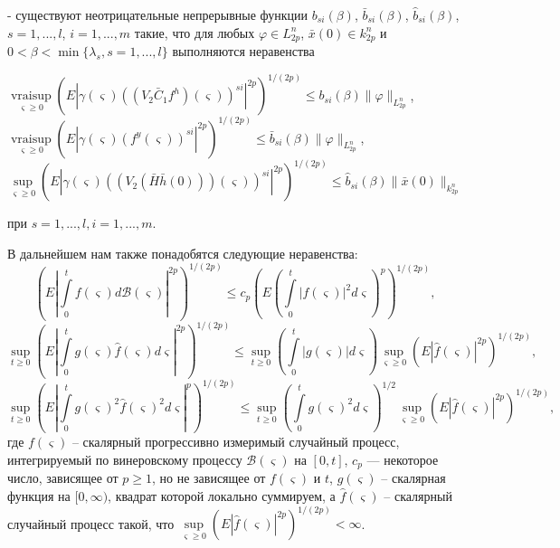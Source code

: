 - существуют неотрицательные непрерывные функции $b_{si}(\beta)$,
$\bar b_{si}(\beta)$, $\hat b_{si}(\beta)$, $s= 1, ..., l$, $i= 1,
..., m$ такие,  что для любых $\varphi \in L^n_{2p}$, $\bar x(0) \in
k_{2p}^n$ и  $0<\beta < \min \{\lambda _s, s = 1, ..., l \}$
выполняются неравенства
 \begin{center} $\mathrel {\mathop
 {vrai \sup} \limits _{\varsigma \geq 0}} \left(E\left |\gamma (\varsigma )
((V_2 \bar C_1 f^h)(\varsigma))^{si}\right |^{2p}\right )^{1/(2p)}
\leq b_{si}(\beta) \|\varphi \|_{L^n_{2p}}$, \\
$\mathrel {\mathop
 {vrai \sup} \limits _{\varsigma \geq 0} }\left(E\left|\gamma (\varsigma )
(f^y(\varsigma ))^{si}\right |^{2p}\right )^{1/(2p)}\leq \bar
b_{si}(\beta) \|\varphi \|_{L^n_{2p}}$,\\
$\sup \limits _{\varsigma \geq 0}\left (E\left |\gamma (\varsigma)
((V_2(\bar H \bar h(0)))(\varsigma))^{si}\right |^{2p}\right
)^{1/(2p)} \leq \hat b_{si}(\beta)\|\bar x(0)\|_{k^n_{2p}}$
\end{center} при $s = 1,...,l, i = 1, ..., m$.

В дальнейшем нам также понадобятся следующие неравенства:\\
 \begin{equation}
    \label{eq:kri-11}
    \left (E\left |\int \limits _0^tf(\varsigma )d\mathcal B(\varsigma
    )\right |^{2p}\right )^{1/(2p)} \leq c_p \left (E\left (\int \limits
    _0^t|f(\varsigma )|^2d\varsigma\right )^p\right )^{1/(2p)},
 \end{equation}
\begin{equation}
    \label{eq:kri-12}
     \sup \limits _{t \geq 0}\left(E\left|\int \limits
     _0^tg(\varsigma)\hat f(\varsigma)d\varsigma\right|^{2p}\right)^{1/(2p)}
     \leq \sup \limits _{t \geq 0}\left (\int \limits
     _0^t|g(\varsigma)|d\varsigma\right )
     \sup \limits _{\varsigma \geq
     0}\left (E\left |\hat f(\varsigma)\right |^{2p}\right )^{1/(2p)},
\end{equation}
 \begin{equation}
\label{eq:kri-13}
\sup \limits _{t \geq 0}\left(E|\int \limits
 _0^tg(\varsigma)^2\hat f(\varsigma)^2d\varsigma|^{p}\right)^{1/(2p)} \leq
 \sup \limits _{t \geq 0}\left (\int \limits
 _0^tg(\varsigma)^2d\varsigma\right)^{1/2}\sup \limits _{\varsigma
 \geq 0}\left (E\left |\hat f(\varsigma)\right |^{2p}\right )^{1/(2p)},
\end{equation}
где $f(\varsigma )$ -- скалярный прогрессивно измеримый случайный
процесс, интегрируемый по винеровскому процессу  $\mathcal
B(\varsigma )$ на $[0, t]$, $c_p$ --- некоторое число, зависящее от
$p\ge 1$, но не зависящее от $f(\varsigma )$ и $t$, $g(\varsigma)$
-- скалярная функция на $[0,
 \infty)$, квадрат которой локально суммируем, а $\hat f(\varsigma)$ --
скалярный случайный процесс такой, что $\sup \limits _{\varsigma
\geq 0}\left (E\left |\hat f(\varsigma)\right |^{2p}\right
)^{1/(2p)} < \infty$.

